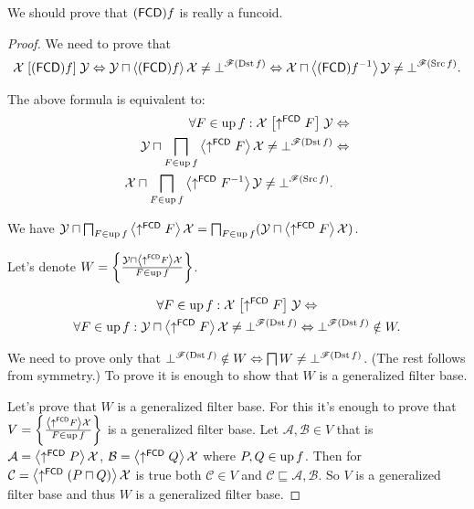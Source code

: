 We should prove that $(\mathsf{FCD}) f$ is really a funcoid.
\begin{proof}
We need to prove that
\[
\mathcal{X}\mathrel{\left[(\mathsf{FCD}) f\right]}\mathcal{Y}\Leftrightarrow\mathcal{Y}\sqcap\left\langle (\mathsf{FCD}) f\right\rangle\mathcal{X}\ne\bot^{\mathscr{F}(\operatorname{Dst} f)}\Leftrightarrow\mathcal{X}\sqcap\left\langle (\mathsf{FCD}) f^{-1}\right\rangle\mathcal{Y}\ne\bot^{\mathscr{F}(\operatorname{Src} f)}.
\]


The above formula is equivalent to:
\begin{align*}
\forall F\in\operatorname{up} f:\mathcal{X}\mathrel{\left[\uparrow^{\mathsf{FCD}}F\right]}\mathcal{Y} & \Leftrightarrow\\
\mathcal{Y}\sqcap\bigsqcap_{F\in\operatorname{up} f}\left\langle \uparrow^{\mathsf{FCD}}F\right\rangle\mathcal{X}\ne\bot^{\mathscr{F}(\operatorname{Dst} f)} & \Leftrightarrow\\
\mathcal{X}\sqcap\bigsqcap_{F\in\operatorname{up} f}\left\langle \uparrow^{\mathsf{FCD}}F^{-1}\right\rangle\mathcal{Y}\ne\bot^{\mathscr{F}(\operatorname{Src} f)}.
\end{align*}


We have $\mathcal{Y}\sqcap\bigsqcap_{F\in\operatorname{up} f}\left\langle \uparrow^{\mathsf{FCD}}F\right\rangle\mathcal{X}=\bigsqcap_{F\in\operatorname{up} f}(\mathcal{Y}\sqcap\left\langle \uparrow^{\mathsf{FCD}}F\right\rangle\mathcal{X})$.

Let's denote $W=\left\{ \frac{\mathcal{Y}\sqcap\left\langle \uparrow^{\mathsf{FCD}}F\right\rangle\mathcal{X}}{F\in\operatorname{up} f}\right\}$.

\begin{multline*}
\forall F\in\operatorname{up} f:\mathcal{X}\mathrel{\left[\uparrow^{\mathsf{FCD}}F\right]}\mathcal{Y}\Leftrightarrow\\
\forall F\in\operatorname{up} f:\mathcal{Y}\sqcap\left\langle \uparrow^{\mathsf{FCD}}F\right\rangle\mathcal{X}\ne\bot^{\mathscr{F}(\operatorname{Dst} f)}\Leftrightarrow\bot^{\mathscr{F}(\operatorname{Dst} f)}\notin W.
\end{multline*}


We need to prove only that $\bot^{\mathscr{F}(\operatorname{Dst} f)}\notin W\Leftrightarrow\bigsqcap W\ne\bot^{\mathscr{F}(\operatorname{Dst} f)}$.
(The rest follows from symmetry.) To prove it is enough to show that $W$ is a generalized filter base.

Let's prove that $W$ is a generalized filter base. For this it's
enough to prove that $V=\left\{ \frac{\left\langle \uparrow^{\mathsf{FCD}}F\right\rangle\mathcal{X}}{F\in\operatorname{up} f}\right\}$
is a generalized filter base. Let $\mathcal{A},\mathcal{B}\in V$
that is $\mathcal{A}=\left\langle \uparrow^{\mathsf{FCD}}P\right\rangle\mathcal{X}$,
$\mathcal{B}=\left\langle \uparrow^{\mathsf{FCD}}Q\right\rangle\mathcal{X}$ where
$P,Q\in\operatorname{up} f$. Then for $\mathcal{C}=\left\langle \uparrow^{\mathsf{FCD}}(P\sqcap Q)\right\rangle\mathcal{X}$
is true both $\mathcal{C}\in V$ and $\mathcal{C}\sqsubseteq\mathcal{A},\mathcal{B}$.
So $V$ is a generalized filter base and thus $W$ is a generalized
filter base.\end{proof}
